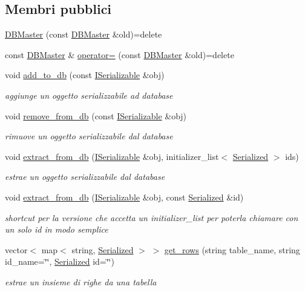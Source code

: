 \subsection*{Membri pubblici}
\begin{DoxyCompactItemize}
\item 
\hyperlink{classmm_1_1_d_b_master_a7571cbb3fe77a491d57595ec9bc86abf}{D\+B\+Master} (const \hyperlink{classmm_1_1_d_b_master}{D\+B\+Master} \&old)=delete
\item 
const \hyperlink{classmm_1_1_d_b_master}{D\+B\+Master} \& \hyperlink{classmm_1_1_d_b_master_af556b0856b79cb8bff3da0565badeac0}{operator=} (const \hyperlink{classmm_1_1_d_b_master}{D\+B\+Master} \&old)=delete
\item 
void \hyperlink{classmm_1_1_d_b_master_a187988c8741d0a2c5806919b8d672af0}{add\+\_\+to\+\_\+db} (const \hyperlink{classmm_1_1_i_serializable}{I\+Serializable} \&obj)
\begin{DoxyCompactList}\small\item\em aggiunge un oggetto serializzabile ad database \end{DoxyCompactList}\item 
void \hyperlink{classmm_1_1_d_b_master_a4d5d51bf4b3437294a52fcd3747520d3}{remove\+\_\+from\+\_\+db} (const \hyperlink{classmm_1_1_i_serializable}{I\+Serializable} \&obj)
\begin{DoxyCompactList}\small\item\em rimuove un oggetto serializzabile dal database \end{DoxyCompactList}\item 
void \hyperlink{classmm_1_1_d_b_master_a9e8092b67a249a273668ad042a4084e2}{extract\+\_\+from\+\_\+db} (\hyperlink{classmm_1_1_i_serializable}{I\+Serializable} \&obj, initializer\+\_\+list$<$ \hyperlink{structmm_1_1_serialized}{Serialized} $>$ ids)
\begin{DoxyCompactList}\small\item\em estrae un oggetto serializzabile dal database \end{DoxyCompactList}\item 
void \hyperlink{classmm_1_1_d_b_master_a68c25d223994752e8b4d6156a23651f2}{extract\+\_\+from\+\_\+db} (\hyperlink{classmm_1_1_i_serializable}{I\+Serializable} \&obj, const \hyperlink{structmm_1_1_serialized}{Serialized} \&id)
\begin{DoxyCompactList}\small\item\em shortcut per la versione che accetta un initializer\+\_\+list per poterla chiamare con un solo id in modo semplice \end{DoxyCompactList}\item 
vector$<$ map$<$ string, \hyperlink{structmm_1_1_serialized}{Serialized} $>$ $>$ \hyperlink{classmm_1_1_d_b_master_aef9d7063da9d7b4e0fb0a20a6d06368f}{get\+\_\+rows} (string table\+\_\+name, string id\+\_\+name=\char`\"{}\char`\"{}, \hyperlink{structmm_1_1_serialized}{Serialized} id=\char`\"{}\char`\"{})
\begin{DoxyCompactList}\small\item\em estrae un insieme di righe da una tabella \end{DoxyCompactList}\end{DoxyCompactItemize}
